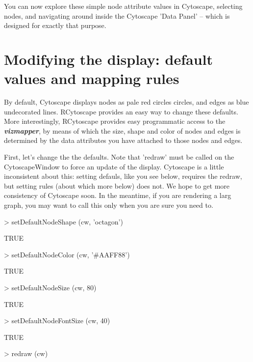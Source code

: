 \documentclass[12pt]{article}
\begin{document}
You can now explore these simple node attribute values in Cytoscape, selecting nodes, and navigating around inside the Cytoscape 'Data Panel' -- which is designed for exactly that purpose.


\section{Modifying the display:  default values and mapping rules}

By default, Cytoscape displays nodes as pale red circles circles, and edges as blue undecorated lines.  RCytoscape
provides an easy way to change these defaults.  More interestingly, RCytoscape provides easy programmatic access to the
\emph{\textbf{vizmapper}}, by means of which the size, shape and color of nodes and edges is determined by the data attributes you have attached to those nodes and edges. 

First, let's change the the defaults.  Note that 'redraw' must be called on the CytoscapeWindow to force an update of
the display.  Cytoscape is a little inconsistent about this:  setting
defauls, like you see below, requires the redraw, but setting rules
(about which more below) does not.  We hope to get more consistency of
Cytoscape soon.  In the meantime, if you are rendering a larg graph, you may want to call this only when you are sure you need to.

\begin{Schunk}
\begin{Sinput}
>   setDefaultNodeShape (cw, 'octagon')
\end{Sinput}
\begin{Soutput}
[1] TRUE
\end{Soutput}
\begin{Sinput}
>   setDefaultNodeColor (cw, '#AAFF88')
\end{Sinput}
\begin{Soutput}
[1] TRUE
\end{Soutput}
\begin{Sinput}
>   setDefaultNodeSize  (cw, 80)
\end{Sinput}
\begin{Soutput}
[1] TRUE
\end{Soutput}
\begin{Sinput}
>   setDefaultNodeFontSize (cw, 40)
\end{Sinput}
\begin{Soutput}
[1] TRUE
\end{Soutput}
\begin{Sinput}
>   redraw (cw)
\end{Sinput}
\end{Schunk}
\end{document}
